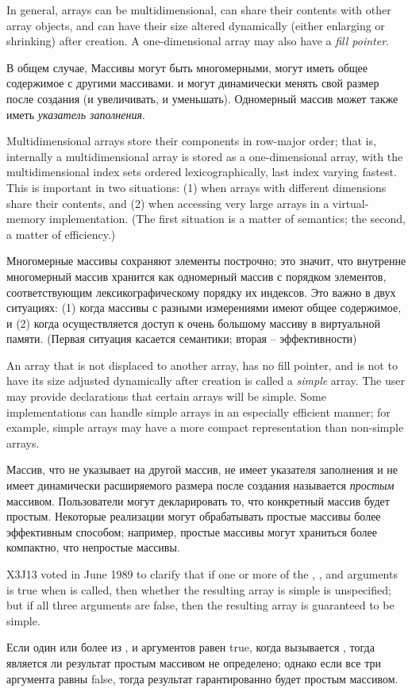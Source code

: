 In general, arrays can be multidimensional,
can share their contents with other array objects, and can have their
size altered dynamically (either enlarging or shrinking) after creation.
A one-dimensional array may also have a \emph{fill pointer}.

В общем случае, Массивы могут быть многомерными, могут иметь общее содержимое с
другими массивами. и могут динамически менять свой размер после создания (и
увеличивать, и уменьшать).
Одномерный массив может также иметь \emph{указатель заполнения}.

Multidimensional arrays store their components in row-major order;
that is, internally a multidimensional array is stored as a one-dimensional
array, with the multidimensional index sets ordered lexicographically,
last index varying fastest.  This is important in two situations:
(1) when arrays with different dimensions share their contents, and
(2) when accessing very large arrays in a virtual-memory implementation.
(The first situation is a matter of semantics; the second, a matter
of efficiency.)

Многомерные массивы сохраняют элементы построчно;
это значит, что внутренне многомерный массив хранится как одномерный массив с
порядком элементов, соответствующим лексикографическому порядку их индексов. Это
важно в двух ситуациях:
(1) когда массивы с разными измерениями имеют общее содержимое, и 
(2) когда осуществляется доступ к очень большому массиву в виртуальной памяти.
(Первая ситуация касается семантики; вторая -- эффективности)

An array that is not displaced to another array, has no fill pointer, and
is not to have its size adjusted dynamically after creation is called a
\emph{simple} array.  The user may provide declarations that certain arrays
will be simple.  Some implementations can handle simple arrays in an
especially efficient manner; for example, simple arrays may have a more
compact representation than non-simple arrays.

Массив, что не указывает на другой массив, не имеет указателя заполнения и не
имеет динамически расширяемого размера после создания называется \emph{простым}
массивом. Пользователи могут декларировать то, что конкретный массив будет
простым. Некоторые реализации могут обрабатывать простые массивы более
эффективным способом; например, простые массивы могут храниться более компактно,
что непростые массивы. 

\begin{newer}
X3J13 voted in June 1989
to clarify that if one or more of the , ,
and  arguments is true when 
is called, then whether the resulting
array is simple is unspecified; but if all three arguments are false,
then the resulting array is guaranteed to be simple.

Если один или более из ,  и
 аргументов равен true, когда вызывается ,
тогда является ли результат простым массивом не определено; однако если все три
аргумента равны false, тогда результат гарантированно будет простым массивом.
\end{newer}

